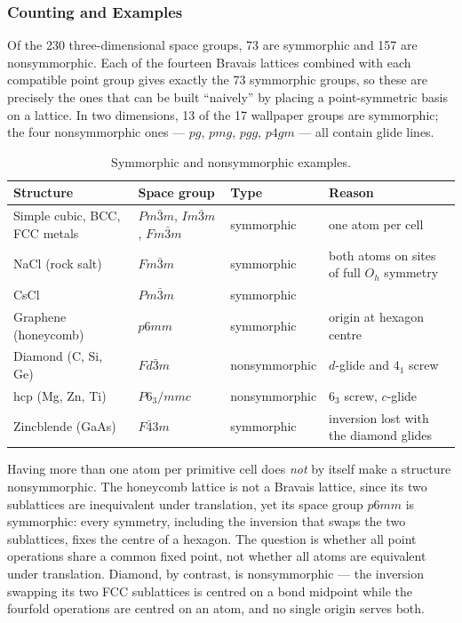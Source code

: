 \subsubsection{Counting and Examples}

Of the 230 three-dimensional space groups, 73 are symmorphic and 157 are nonsymmorphic. Each of the fourteen Bravais lattices combined with each compatible point group gives exactly the 73 symmorphic groups, so these are precisely the ones that can be built ``naively'' by placing a point-symmetric basis on a lattice. In two dimensions, 13 of the 17 wallpaper groups are symmorphic; the four nonsymmorphic ones --- $pg$, $pmg$, $pgg$, $p4gm$ --- all contain glide lines.

\begin{table}[ht]
    \centering
    \caption{Symmorphic and nonsymmorphic examples.}
    \label{tab:xrd-symmorphic}
    \begin{tabular}{llll}
        \toprule
        Structure & Space group & Type & Reason \\
        \midrule
        Simple cubic, BCC, FCC metals & $Pm\bar{3}m$, $Im\bar{3}m$, $Fm\bar{3}m$ & symmorphic & one atom per cell \\
        NaCl (rock salt) & $Fm\bar{3}m$ & symmorphic & both atoms on sites of full $O_h$ symmetry \\
        CsCl & $Pm\bar{3}m$ & symmorphic & \\
        Graphene (honeycomb) & $p6mm$ & symmorphic & origin at hexagon centre \\
        Diamond (C, Si, Ge) & $Fd\bar{3}m$ & nonsymmorphic & $d$-glide and $4_1$ screw \\
        hcp (Mg, Zn, Ti) & $P6_3/mmc$ & nonsymmorphic & $6_3$ screw, $c$-glide \\
        Zincblende (GaAs) & $F\bar{4}3m$ & symmorphic & inversion lost with the diamond glides \\
        \bottomrule
    \end{tabular}
\end{table}

\begin{fact}
Having more than one atom per primitive cell does \emph{not} by itself make a structure nonsymmorphic. The honeycomb lattice is not a Bravais lattice, since its two sublattices are inequivalent under translation, yet its space group $p6mm$ is symmorphic: every symmetry, including the inversion that swaps the two sublattices, fixes the centre of a hexagon. The question is whether all point operations share a common fixed point, not whether all atoms are equivalent under translation. Diamond, by contrast, is nonsymmorphic --- the inversion swapping its two FCC sublattices is centred on a bond midpoint while the fourfold operations are centred on an atom, and no single origin serves both.
\end{fact}


